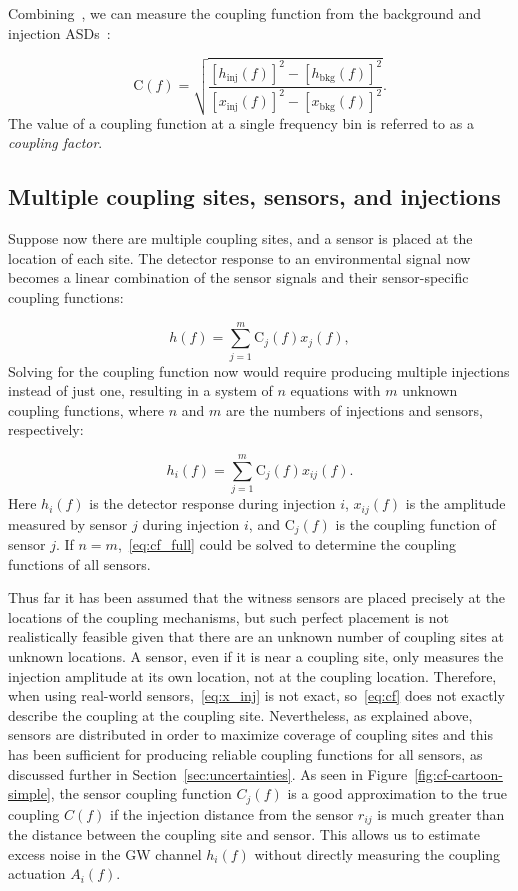 Combining~, we can measure the coupling function from the background and injection \acp{ASD}~\citep{Kruk_2016, pem_code}:

\begin{equation}\label{eq:cf}
	\mathrm{C}(f) = \sqrt{\frac{[h_{\textrm{inj}}(f)]^2 - [h_{\textrm{bkg}}(f)]^2}{[x_{\textrm{inj}}(f)]^2 - [x_{\textrm{bkg}}(f)]^2}}.
\end{equation}
The value of a coupling function at a single frequency bin is referred to as a \textit{coupling factor}.

\subsection{Multiple coupling sites, sensors, and injections}

Suppose now there are multiple coupling sites, and a sensor is placed at the location of each site.
The detector response to an environmental signal now becomes a linear combination of the sensor signals and their sensor-specific coupling functions:

\begin{equation}\label{eq:cf_model_expanded}
	h(f) = \sum_{j=1}^{m} \mathrm{C}_j(f) x_{j}(f),
\end{equation}
Solving for the coupling function now would require producing multiple injections instead of just one, resulting in a system of $n$ equations with $m$ unknown coupling functions, where $n$ and $m$ are the numbers of injections and sensors, respectively:

\begin{equation}\label{eq:cf_full}
	h_i(f) = \sum_{j=1}^{m} \mathrm{C}_j(f) x_{ij}(f).
\end{equation}
Here $h_i(f)$ is the detector response during injection $i$, $x_{ij}(f)$ is the amplitude measured by sensor $j$ during injection $i$, and $\mathrm{C}_j(f)$ is the coupling function of sensor $j$.
If $n = m$,~\cref{eq:cf_full} could be solved to determine the coupling functions of all sensors.

Thus far it has been assumed that the witness sensors are placed precisely at the locations of the coupling mechanisms, but such perfect placement is not realistically feasible given that there are an unknown number of coupling sites at unknown locations.
A sensor, even if it is near a coupling site, only measures the injection amplitude at its own location, not at the coupling location.
Therefore, when using real-world sensors,~\cref{eq:x_inj} is not exact, so~\cref{eq:cf} does not exactly describe the coupling at the coupling site.
Nevertheless, as explained above, sensors are distributed in order to maximize coverage of coupling sites and this has been sufficient for producing reliable coupling functions for all sensors, as discussed further in Section~\ref{sec:uncertainties}.
As seen in Figure~\ref{fig:cf-cartoon-simple}, the sensor coupling function $C_j(f)$ is a good approximation to the true coupling $C(f)$ if the injection distance from the sensor $r_{ij}$ is much greater than the distance between the coupling site and sensor.
This allows us to estimate excess noise in the \ac{GW} channel $h_i(f)$ without directly measuring the coupling actuation $A_i(f)$.

